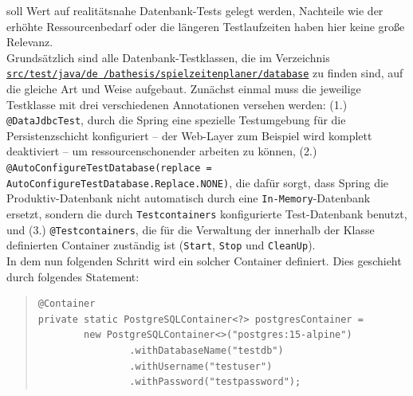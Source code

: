 soll Wert auf realitätsnahe Datenbank-Tests gelegt werden, Nachteile wie der erhöhte 
Ressourcenbedarf oder die längeren Testlaufzeiten haben hier keine große Relevanz. \\ 
Grundsätzlich sind alle Datenbank-Testklassen, die im Verzeichnis 
\href{https://github.com/FlorianOhmes/bat_spielzeitenplaner/tree/main/spielzeitenplaner/src/test/java/de/bathesis/spielzeitenplaner/database}{\texttt{src/test/java/de \linebreak /bathesis/spielzeitenplaner/database}}
zu finden sind, auf die gleiche Art und Weise aufgebaut. Zunächst einmal muss die 
jeweilige Testklasse mit drei verschiedenen Annotationen versehen werden: 
(1.) \texttt{@DataJdbcTest}, durch die Spring eine spezielle Testumgebung für die 
Persistenzschicht konfiguriert -- der Web-Layer zum Beispiel wird komplett deaktiviert 
-- um ressourcenschonender arbeiten zu können, (2.) 
\texttt{@AutoConfigureTestDatabase(replace = AutoConfigureTestDatabase.Replace.NONE)}, 
die dafür sorgt, dass Spring die Produktiv-Datenbank nicht automatisch durch eine 
\texttt{In-Memory}-Datenbank ersetzt, sondern die durch \texttt{Testcontainers} 
konfigurierte Test-Datenbank benutzt, und (3.) \texttt{@Testcontainers}, die für die 
Verwaltung der innerhalb der Klasse definierten Container zuständig ist 
(\texttt{Start}, \texttt{Stop} und \texttt{CleanUp}). \\ 
In dem nun folgenden Schritt wird ein solcher Container definiert. Dies geschieht 
durch folgendes Statement: 

\begin{quote}
\begin{verbatim}
@Container
private static PostgreSQLContainer<?> postgresContainer = 
        new PostgreSQLContainer<>("postgres:15-alpine")
                .withDatabaseName("testdb")
                .withUsername("testuser")
                .withPassword("testpassword");
\end{verbatim}
\end{quote}

